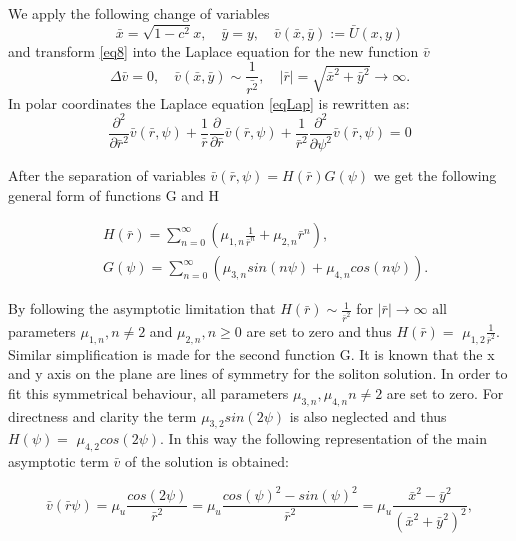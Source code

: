 \documentclass[12pt]{article}
\theoremstyle{theorem}
\theoremstyle{defi}
\begin{document}
We apply the following change of variables
\begin{equation}
\bar{x} = \sqrt{1-c^2}x , \quad  \bar{y} = y, \quad \bar{v}( \bar{x}, \bar{y}) := \bar{U} (x, y)\label{eqVC}
\end{equation}
and transform \eqref{eq8} into the Laplace equation for the new function $\bar{v}$
\begin{equation} \label{eqLap}
\Delta \bar{v} = 0, \quad \bar{v}( \bar{x}, \bar{y}) \sim \frac{1}{\bar{r^2}}, \quad |\bar{r}|=\sqrt{\bar{x}^2 + \bar{y}^2} \rightarrow \infty.
\end{equation}
In polar coordinates the Laplace equation \eqref{eqLap} is rewritten as:
\begin{equation} \label{eqLapPol}
\frac{\partial^2}{\partial \bar{r}^2} \bar{v}(\bar{r}, \psi) + \frac{1}{\bar{r}} \frac{\partial}{\partial \bar{r}}\bar{v}(\bar{r}, \psi) +  \frac{1}{\bar{r}^2} \frac{\partial^2}{\partial \psi^2} \bar{v}(\bar{r}, \psi) = 0
\end{equation}

After the separation of variables $\bar{v}(\bar{r}, \psi) = H(\bar{r})G(\psi)$  we get the following general form of functions G and H 

\begin{align}
&H(\bar{r}) = \sum^{\infty}_{n=0} (\mu_{1,n} \frac{1}{ \bar{r}^n} + \mu_{2,n} \bar{r}^n ),
\\ \nonumber &G(\psi) = \sum^{\infty}_{n=0} (\mu_{3,n}sin(n \psi ) + \mu_{4,n}cos(n \psi)). \label{eq9}
\end{align}

By following the asymptotic limitation that $H(\bar{r}) \sim \frac{1}{\bar{r}^2} $  for $|\bar{r}| \rightarrow \infty $ all parameters $\mu_{1,n}, n \neq 2$ and $\mu_{2,n},  n \geq 0$  are set to zero  and thus $H(\bar{r}) =$ $\mu_{1,2} \frac{1}{ \bar{r}^2 }$.
Similar simplification is made for the second function G. It is known that the x and y axis on the plane are lines of symmetry for the soliton solution. In order to fit this symmetrical behaviour, all parameters $\mu_{3,n},\mu_{4,n}  n \neq 2$  are set to zero. For directness and clarity the term $\mu_{3,2}sin(2\psi)$ is also neglected and thus $H(\psi) = $ $\mu_{4,2} cos(2 \psi)$. In this way the following representation of the main asymptotic term $\bar{v}$ of the solution is obtained:

\begin{equation}
\bar{v}(\bar{r} \psi) = \mu_u \frac{cos(2 \psi)}{ \bar{r}^2 } = 
 \mu_u \frac{cos(\psi) ^ 2 - sin(\psi)^2}{ \bar{r}^2 } = 
 \mu_u \frac{\bar{x}  ^ 2 - \bar{y}  ^ 2}{( \bar{x}  ^ 2 + \bar{y}  ^ 2)^2 } , \label{eq10}
\end{equation}
\end{document}
